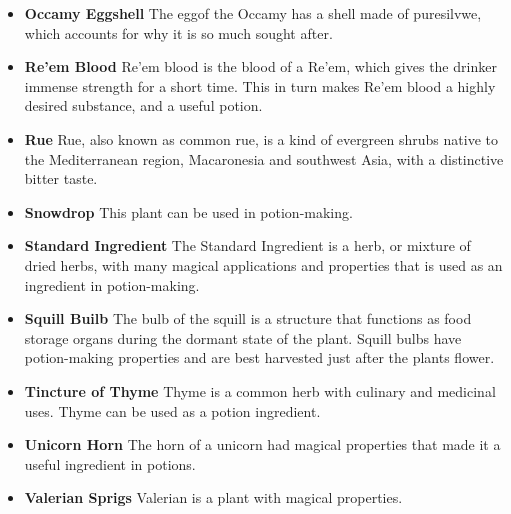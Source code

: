 \begin{itemize}
 \item \textbf {Occamy Eggshell}
The eggof the Occamy has a shell made of puresilvwe, which accounts for why it is so much sought after.

 \item \textbf {Re'em Blood}
Re'em blood is the blood of a Re'em, which gives the drinker immense strength for a short time. This in turn makes Re'em blood a highly desired substance, and a useful potion.

 \item \textbf {Rue}
Rue, also known as common rue, is a kind of evergreen shrubs native to the Mediterranean region, Macaronesia and southwest Asia, with a distinctive bitter taste.

 \item \textbf {Snowdrop}
This plant can be used in potion-making.

 \item \textbf {Standard Ingredient}
The Standard Ingredient is a herb, or mixture of dried herbs, with many magical applications and properties that is used as an ingredient in potion-making. 

 \item \textbf {Squill Builb}
The bulb of the squill is a structure that functions as food storage organs during the dormant state of the plant. Squill bulbs have potion-making properties and are best harvested just after the plants flower.

 \item \textbf {Tincture of Thyme}
Thyme is a common herb with culinary and medicinal uses. Thyme can be used as a potion ingredient.

 \item \textbf {Unicorn Horn}
The horn of a unicorn had magical properties that made it a useful ingredient in potions.

 \item \textbf {Valerian Sprigs}
 Valerian is a plant with magical properties.
 \end{itemize}
    \pagebreak
